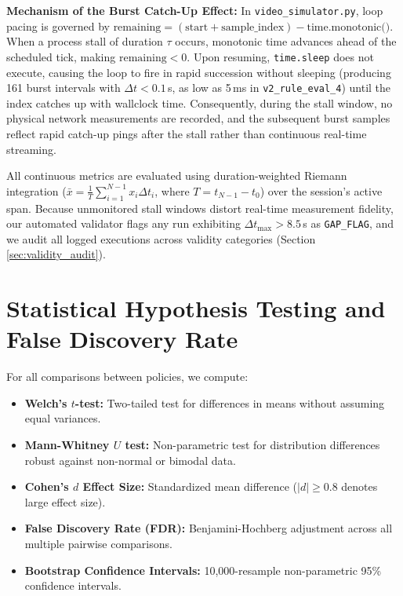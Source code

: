 \documentclass[12pt,a4paper,oneside]{report}
\begin{document}
\textbf{Mechanism of the Burst Catch-Up Effect:}
In \texttt{video\_simulator.py}, loop pacing is governed by $\text{remaining} = (\text{start} + \text{sample\_index}) - \text{time.monotonic()}$. When a process stall of duration $\tau$ occurs, monotonic time advances ahead of the scheduled tick, making $\text{remaining} < 0$. Upon resuming, \texttt{time.sleep} does not execute, causing the loop to fire in rapid succession without sleeping (producing 161 burst intervals with $\Delta t < 0.1$\,s, as low as 5\,ms in \texttt{v2\_rule\_eval\_4}) until the index catches up with wallclock time. Consequently, during the stall window, no physical network measurements are recorded, and the subsequent burst samples reflect rapid catch-up pings after the stall rather than continuous real-time streaming.

All continuous metrics are evaluated using duration-weighted Riemann integration ($\bar{x} = \frac{1}{T} \sum_{i=1}^{N-1} x_i \Delta t_i$, where $T = t_{N-1} - t_0$) over the session's active span. Because unmonitored stall windows distort real-time measurement fidelity, our automated validator flags any run exhibiting $\Delta t_{\max} > 8.5$\,s as \texttt{GAP\_FLAG}, and we audit all logged executions across validity categories (Section \ref{sec:validity_audit}).

\section{Statistical Hypothesis Testing and False Discovery Rate}
For all comparisons between policies, we compute:
\begin{itemize}
  \item \textbf{Welch's $t$-test:} Two-tailed test for differences in means without assuming equal variances.
  \item \textbf{Mann-Whitney $U$ test:} Non-parametric test for distribution differences robust against non-normal or bimodal data.
  \item \textbf{Cohen's $d$ Effect Size:} Standardized mean difference ($|d| \ge 0.8$ denotes large effect size).
  \item \textbf{False Discovery Rate (FDR):} Benjamini-Hochberg adjustment across all multiple pairwise comparisons.
  \item \textbf{Bootstrap Confidence Intervals:} 10,000-resample non-parametric 95\% confidence intervals.
\end{itemize}


\end{document}
